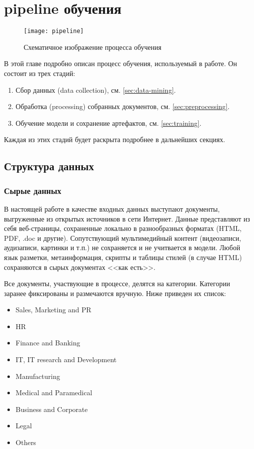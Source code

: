 
\chapter{\Gls{pipeline} обучения}
\begin{figure}[h]
    \centering
    \texttt{[image: pipeline]}
    \caption{Схематичное изображение процесса обучения}
    \label{fig:pipeline}
\end{figure}

В этой главе подробно описан процесс обучения, используемый в работе.
Он состоит из трех стадий:
\begin{enumerate}
    \item Сбор данных (data collection), см. \ref{sec:data-mining}.
    \item Обработка (processing) собранных документов, см. \ref{sec:preprocessing}.
    \item Обучение модели и сохранение артефактов, см. \ref{sec:training}.
\end{enumerate}
Каждая из этих стадий будет раскрыта подробнее в дальнейших секциях.

\section{Структура данных}
\subsection{Сырые данных}
В настоящей работе в качестве входных данных выступают документы, выгруженные из открытых источников в сети Интернет.
Данные представляют из себя веб-страницы, сохраненные локально в разнообразных форматах (HTML, PDF, .doc и другие).
Сопутствующий мультимедийный контент (видеозаписи, аудизаписи, картинки и т.п.) не сохраняется и не учитвается в модели.
Любой язык разметки, метаинформация, скрипты и таблицы стилей (в случае HTML) сохраняются в сырых документах <<как есть>>.

Все документы, участвующие в процессе, делятся на категории.
Категории заранее фиксированы и размечаются вручную.
Ниже приведен их список:
\label{categories}
\begin{itemize}
    \item Sales, Marketing and PR
    \item HR
    \item Finance and Banking
    \item IT, IT research and Development
    \item Manufacturing
    \item Medical and Paramedical
    \item Business and Corporate
    \item Legal
    \item Others
\end{itemize}

